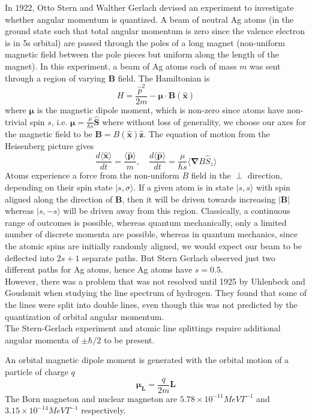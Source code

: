 \documentclass[a4paper]{article}
\begin{document}
\begin{Note}
In 1922, Otto Stern and Walther Gerlach devised an experiment to investigate whether angular momentum is quantized. A beam of neutral Ag atoms (in the ground state such that total angular momentum is zero since the valence electron is in 5s orbital) are passed through the poles of a long magnet (non-uniform magnetic field between the pole pieces but uniform along the length of the magnet). In this experiment, a beam of Ag atoms each of mass $m$ was sent through a region of varying $\mathbf{B}$ field. The Hamiltonian is 
$$H=\frac{\hat{p}^2}{2m}-\boldsymbol{\mu}\cdot\mathbf{B}(\mathbf{\hat{x}})$$
where $\boldsymbol{\mu}$ is the magnetic dipole moment, which is non-zero since atoms have non-trivial spin $s$, i.e. $\boldsymbol{\mu}=\frac{\mu}{\hbar s}\mathbf{\hat{S}}$ where without loss of generality, we choose our axes for the magnetic field to be $\mathbf{B}=B(\mathbf{\hat{x}})\mathbf{\hat{z}}$. The equation of motion from the Heisenberg picture gives
$$\frac{d\langle\mathbf{\hat{x}}\rangle}{dt}=\frac{\langle\mathbf{\hat{p}}\rangle}{m},\quad \frac{d\langle\mathbf{\hat{p}}\rangle}{dt}=\frac{\mu}{\hbar s}\langle\boldsymbol{\nabla}B \hat{S}_z\rangle$$
Atoms experience a force from the non-uniform $B$ field in the $\perp$ direction, depending on their spin state $|s,\sigma\rangle$. If a given atom is in state $|s,s\rangle$ with spin aligned along the direction of $\mathbf{B}$, then it will be driven towards increasing $|\mathbf{B}|$ whereas $|s,-s\rangle$ will be driven away from this region. Classically, a continuous range of outcomes is possible, whereas quantum mechanically, only a limited number of discrete momenta are possible, whereas in quantum mechanics, since the atomic spins are initially randomly aligned, we would expect our beam to be deflected into $2s+1$ separate paths. But Stern Gerlach observed just two different paths for Ag atoms, hence Ag atoms have $s=0.5$. \\[5pt]
However, there was a problem that was not resolved until 1925 by Uhlenbeck and Goudsmit when studying the line spectrum of hydrogen. They found that some of the lines were split into double lines, even though this was not predicted by the quantization of orbital angular momentum.\\[5pt]
The Stern-Gerlach experiment and atomic line splittings require additional angular momenta of $\pm\hbar/2$ to be present.
\end{Note}
\begin{defi}
An orbital magnetic dipole moment is generated with the orbital motion of a particle of charge $q$
$$\boldsymbol{\mu_L}=\frac{q}{2m}\mathbf{L}$$
The Born magneton and nuclear magneton are $5.78\times10^{-11}MeVT^{-1}$ and $3.15\times10^{-14}MeVT^{-1}$ respectively.
\end{defi}
\end{document}
